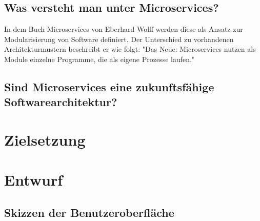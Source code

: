 \subsection{Was versteht man unter Microservices?}
\label{subsec:wasverstehtmanuntermicroservices}
In dem Buch Microservices von Eberhard Wolff werden diese als Ansatz zur Modularisierung
von Software definiert. Der Unterschied zu vorhandenen Architekturmustern beschreibt er wie folgt:
"Das Neue: Microservices nutzen als Module einzelne Programme, die als eigene Prozesse laufen."\cite[S. 2]{MicroservicesBook}


\subsection{Sind Microservices eine zukunftsfähige Softwarearchitektur?}
\label{subsec:sindmicroserviceseinezukunftsfaehigesoftwarearchitektur}

\section{Zielsetzung}
\label{sec:zielsetzung}

\section{Entwurf}
\label{sec:entwurf}

\subsection{Skizzen der Benutzeroberfläche}
\label{subsec:skizzenderbenutzeroberflaeche}

